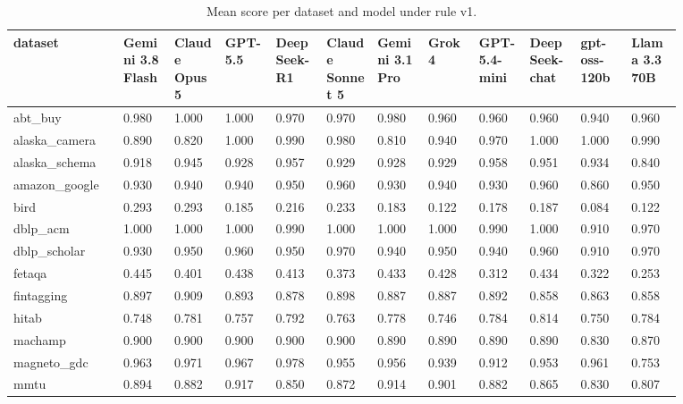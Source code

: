 \begin{landscape}
\tiny
\setlength{\tabcolsep}{3pt}
\begin{longtable}{p{0.134\linewidth}p{0.067\linewidth}p{0.067\linewidth}p{0.067\linewidth}p{0.067\linewidth}p{0.067\linewidth}p{0.067\linewidth}p{0.067\linewidth}p{0.067\linewidth}p{0.067\linewidth}p{0.067\linewidth}p{0.067\linewidth}}
\caption{Mean score per dataset and model under rule v1.}\label{tab:per_dataset_mean_v1_original}\\
\toprule
dataset & Gemini 3.8 Flash & Claude Opus 5 & GPT-5.5 & DeepSeek-R1 & Claude Sonnet 5 & Gemini 3.1 Pro & Grok 4 & GPT-5.4-mini & DeepSeek-chat & gpt-oss-120b & Llama 3.3 70B \\
\midrule
abt\_\allowbreak{}buy & 0.980 & 1.000 & 1.000 & 0.970 & 0.970 & 0.980 & 0.960 & 0.960 & 0.960 & 0.940 & 0.960 \\
alaska\_\allowbreak{}camera & 0.890 & 0.820 & 1.000 & 0.990 & 0.980 & 0.810 & 0.940 & 0.970 & 1.000 & 1.000 & 0.990 \\
alaska\_\allowbreak{}schema & 0.918 & 0.945 & 0.928 & 0.957 & 0.929 & 0.928 & 0.929 & 0.958 & 0.951 & 0.934 & 0.840 \\
amazon\_\allowbreak{}google & 0.930 & 0.940 & 0.940 & 0.950 & 0.960 & 0.930 & 0.940 & 0.930 & 0.960 & 0.860 & 0.950 \\
bird & 0.293 & 0.293 & 0.185 & 0.216 & 0.233 & 0.183 & 0.122 & 0.178 & 0.187 & 0.084 & 0.122 \\
dblp\_\allowbreak{}acm & 1.000 & 1.000 & 1.000 & 0.990 & 1.000 & 1.000 & 1.000 & 0.990 & 1.000 & 0.910 & 0.970 \\
dblp\_\allowbreak{}scholar & 0.930 & 0.950 & 0.960 & 0.950 & 0.970 & 0.940 & 0.950 & 0.940 & 0.960 & 0.910 & 0.970 \\
fetaqa & 0.445 & 0.401 & 0.438 & 0.413 & 0.373 & 0.433 & 0.428 & 0.312 & 0.434 & 0.322 & 0.253 \\
fintagging & 0.897 & 0.909 & 0.893 & 0.878 & 0.898 & 0.887 & 0.887 & 0.892 & 0.858 & 0.863 & 0.858 \\
hitab & 0.748 & 0.781 & 0.757 & 0.792 & 0.763 & 0.778 & 0.746 & 0.784 & 0.814 & 0.750 & 0.784 \\
machamp & 0.900 & 0.900 & 0.900 & 0.900 & 0.900 & 0.890 & 0.890 & 0.890 & 0.890 & 0.830 & 0.870 \\
magneto\_\allowbreak{}gdc & 0.963 & 0.971 & 0.967 & 0.978 & 0.955 & 0.956 & 0.939 & 0.912 & 0.953 & 0.961 & 0.753 \\
mmtu & 0.894 & 0.882 & 0.917 & 0.850 & 0.872 & 0.914 & 0.901 & 0.882 & 0.865 & 0.830 & 0.807 \\

\end{longtable}
\end{landscape}
